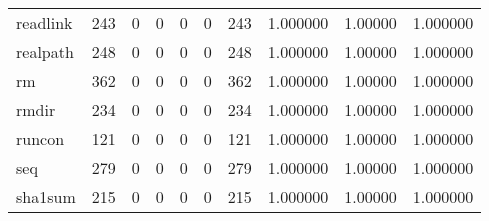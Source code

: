 \begin{tabular}{lrrrrrrrrr}
readlink  &                    243 &                                  0 &                                 0 &                                0 &                                 0 &                             243 &                                1.000000 &                                1.00000 &                             1.000000 \\
realpath  &                    248 &                                  0 &                                 0 &                                0 &                                 0 &                             248 &                                1.000000 &                                1.00000 &                             1.000000 \\
rm        &                    362 &                                  0 &                                 0 &                                0 &                                 0 &                             362 &                                1.000000 &                                1.00000 &                             1.000000 \\
rmdir     &                    234 &                                  0 &                                 0 &                                0 &                                 0 &                             234 &                                1.000000 &                                1.00000 &                             1.000000 \\
runcon    &                    121 &                                  0 &                                 0 &                                0 &                                 0 &                             121 &                                1.000000 &                                1.00000 &                             1.000000 \\
seq       &                    279 &                                  0 &                                 0 &                                0 &                                 0 &                             279 &                                1.000000 &                                1.00000 &                             1.000000 \\
sha1sum   &                    215 &                                  0 &                                 0 &                                0 &                                 0 &                             215 &                                1.000000 &                                1.00000 &                             1.000000 \\

\end{tabular}
